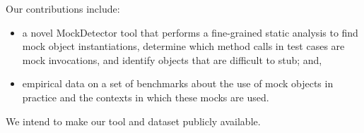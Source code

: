 Our contributions include:
\begin{itemize}
\item a novel {\sc MockDetector} tool that performs a fine-grained static analysis to find mock object instantiations, determine which method calls
in test cases are mock invocations, and identify objects that are difficult to stub; and,
\item empirical data on a set of benchmarks about the use of mock objects in practice and the contexts in which these mocks are used.
\end{itemize}
We intend to make our tool and dataset publicly available.








